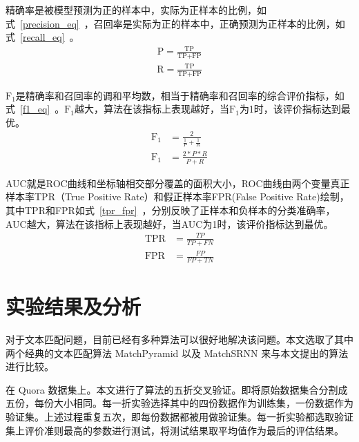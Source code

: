 精确率是被模型预测为正的样本中，实际为正样本的比例，如式~\eqref{precision_eq}~，召回率是实际为正的样本中，正确预测为正样本的比例，如式~\eqref{recall_eq}~。
\begin{equation}
\label{precision_eq}
\begin{aligned}
\text{P}=\frac{\text{TP}}{\text{TP}+\text{FP}}
\end{aligned}
\end{equation}
\begin{equation}
\label{recall_eq}
\begin{aligned}
\text{R}=\frac{\text{TP}}{\text{TP}+\text{FP}}
\end{aligned}
\end{equation}

$\text{F}_1$是精确率和召回率的调和平均数，相当于精确率和召回率的综合评价指标，如式~\eqref{f1_eq}~。$\text{F}_1$越大，算法在该指标上表现越好，当$\text{F}_1$为1时，该评价指标达到最优。
\begin{equation}
\label{f1_eq}
\begin{aligned}
\text{F}_1 &= \frac{2}{\frac{1}{P}+\frac{1}{R}} \\
\text{F}_1 &= \frac{2*P*R}{P+R}
\end{aligned}
\end{equation}

AUC就是ROC曲线和坐标轴相交部分覆盖的面积大小，ROC曲线由两个变量真正样本率TPR（True Positive Rate）和假正样本率FPR(False Positive Rate)绘制，其中TPR和FPR如式~\eqref{tpr_fpr}~，分别反映了正样本和负样本的分类准确率，AUC越大，算法在该指标上表现越好，当AUC为1时，该评价指标达到最优。
\begin{equation}
\label{tpr_fpr}
\begin{aligned}
\text{TPR} &= \frac{TP}{TP+FN} \\
\text{FPR} &= \frac{FP}{FP+TN}
\end{aligned}
\end{equation}


\section{实验结果及分析}
\label{sec:lab_value}
对于文本匹配问题，目前已经有多种算法可以很好地解决该问题。本文选取了其中两个经典的文本匹配算法 MatchPyramid\cite{Pang2016TextMA} 以及 MatchSRNN\cite{Wan2016MatchSRNNMT} 来与本文提出的算法进行比较。

在 Quora 数据集上。本文进行了算法的五折交叉验证。即将原始数据集合分割成五份，每份大小相同。每一折实验选择其中的四份数据作为训练集，一份数据作为验证集。上述过程重复五次，即每份数据都被用做验证集。每一折实验都选取验证集上评价准则最高的参数进行测试，将测试结果取平均值作为最后的评估结果。

